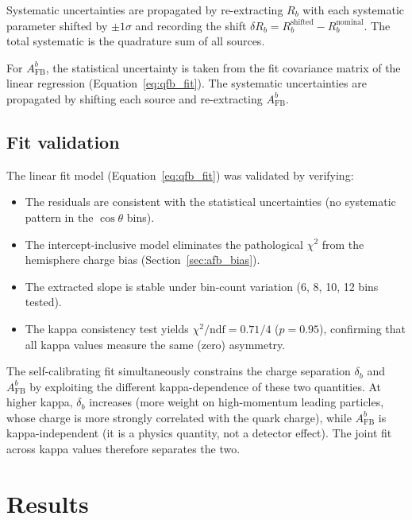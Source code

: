 \documentclass[11pt,a4paper]{article}
\begin{document}
Systematic uncertainties are propagated by re-extracting $R_b$ with each
systematic parameter shifted by $\pm 1\sigma$ and recording the shift
$\delta R_b = R_b^\mathrm{shifted} - R_b^\mathrm{nominal}$. The total
systematic is the quadrature sum of all sources.

For $A_\mathrm{FB}^b$, the statistical uncertainty is taken from the fit
covariance matrix of the linear regression (Equation~\ref{eq:qfb_fit}).
The systematic uncertainties are propagated by shifting each source and
re-extracting $A_\mathrm{FB}^b$.

\subsection{Fit validation}
\label{sec:fit_validation}

The linear fit model (Equation~\ref{eq:qfb_fit}) was validated by verifying:
\begin{itemize}
\item The residuals are consistent with the statistical uncertainties (no systematic
pattern in the $\cos\theta$ bins).
\item The intercept-inclusive model eliminates the pathological $\chi^2$ from the
hemisphere charge bias (Section~\ref{sec:afb_bias}).
\item The extracted slope is stable under bin-count variation (6, 8, 10, 12 bins
tested).
\item The kappa consistency test yields $\chi^2/\mathrm{ndf} = 0.71/4$
($p = 0.95$), confirming that all kappa values measure the same (zero) asymmetry.
\end{itemize}

The self-calibrating fit simultaneously constrains the charge separation $\delta_b$
and $A_\mathrm{FB}^b$ by exploiting the different kappa-dependence of these two
quantities. At higher kappa, $\delta_b$ increases (more weight on high-momentum
leading particles, whose charge is more strongly correlated with the quark charge),
while $A_\mathrm{FB}^b$ is kappa-independent (it is a physics quantity, not a
detector effect). The joint fit across kappa values therefore separates the two.

\FloatBarrier
{}
\section{Results}
\label{sec:results}
\end{document}
